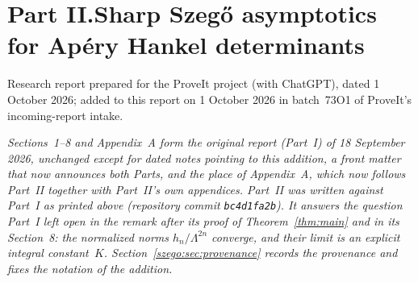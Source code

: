 \documentclass[11pt,a4paper]{article}
\numberwithin{equation}{section}
\theoremstyle{remark}\newtheorem{remark}[theorem]{Remark}
\begin{document}
\clearpage
{}\part*{Part II.\quad Sharp Szeg\H{o} asymptotics for Ap\'ery Hankel determinants}

\par\smallskip
\noindent Research report prepared for the ProveIt project (with ChatGPT),
dated 1 October 2026; added to this report on 1 October 2026 in batch~73O1
of ProveIt's incoming-report intake.\par\medskip

\noindent\emph{Sections~1--8 and Appendix~A form the
original report (Part~I) of 18 September 2026, unchanged except for dated
notes pointing to this addition, a front matter that now announces both
Parts, and the place of Appendix~A, which now follows Part~II together with
Part~II's own appendices. Part~II was written against Part~I as printed above (repository commit
\texttt{bc4d1fa2b}). It answers the question Part~I left open in the remark
after its proof of Theorem~\ref{thm:main} and in its Section~8: the normalized
norms $h_n/\Lambda^{2n}$ converge, and their limit is an explicit integral
constant~$K$. Section~\ref{szego:sec:provenance} records the provenance and
fixes the notation of the addition.}
\end{document}
